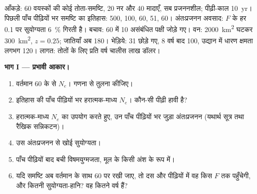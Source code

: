 \begin{problem}
\label{pb:b3:conservation-biology:1}
आँकड़े: 60 वयस्कों की कोई तोता-समष्टि, 20 नर और 40 मादाएँ, सब
प्रजननशील; पीढ़ी-काल \qty{10}{yr}। पिछली पाँच पीढ़ियों भर समष्टि का
इतिहास: 500, 100, 60, 51, 60। अंतःप्रजनन अवसाद: $F$ के हर \qty{0.1}{} पर
सुयोग्यता \qty{6}{\%} गिरती है। बचाव: 60 में 10 असंबंधित पक्षी जोड़े गए।
वन: \qty{2000}{km^2} घटकर \qty{300}{km^2}, $z = 0.25$; जातियाँ अब 180।
भेड़िये: 31 छोड़े गए, 8 वर्ष बाद 100, उद्यान में धारण क्षमता लगभग 120।
लागत: तोतों के लिए प्रति वर्ष चालीस लाख डॉलर।

\medskip
\noindent\textbf{भाग I --- प्रभावी आकार।}
\begin{enumerate}
  \item वर्तमान 60 के  से $N_{e}$। गणना से तुलना कीजिए।
  \item इतिहास की पाँच पीढ़ियों भर हरात्मक-माध्य $N_{e}$। कौन-सी पीढ़ी
        हावी है?
  \item हरात्मक-माध्य $N_{e}$ का उपयोग करते हुए, उन पाँच पीढ़ियों भर
        जुड़ा अंतःप्रजनन (यथार्थ सूत्र तथा रैखिक सन्निकटन)।
  \item उस अंतःप्रजनन से खोई सुयोग्यता।
  \item पाँच पीढ़ियों बाद बची विषमयुग्मजता, मूल के किसी अंश के रूप में।
  \item यदि समष्टि अब वर्तमान  के साथ 60 पर रखी जाए, तो दस और
        पीढ़ियों में वह किस $F$ तक पहुँचेगी, और कितनी सुयोग्यता-हानि? वह
        कितने वर्ष हैं?
\end{enumerate}


\end{problem}
